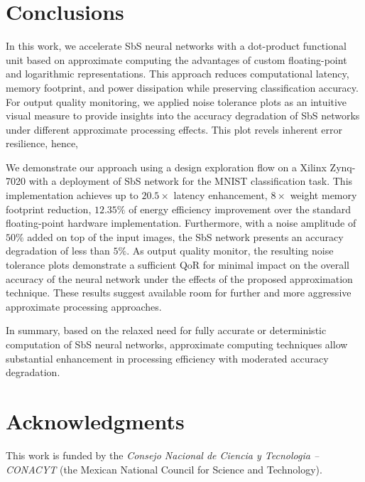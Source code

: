 \section{Conclusions}
\label{sec:conclusions}
In this work, we accelerate SbS neural networks with a dot-product functional unit based on approximate computing  the advantages of custom floating-point and logarithmic representations. This approach reduces computational latency, memory footprint, and power dissipation while preserving classification accuracy. For output quality monitoring, we applied noise tolerance plots as an intuitive visual measure to provide insights into the accuracy degradation of SbS networks under different approximate processing effects. This plot revels inherent error resilience, hence, 


We demonstrate our approach using a design exploration flow on a Xilinx Zynq-7020 with a deployment of SbS network for the MNIST classification task. This implementation achieves up to $20.5\times$ latency enhancement, $8\times$ weight memory footprint reduction,  $12.35\%$ of energy efficiency improvement over the standard floating-point hardware implementation. Furthermore, with a noise amplitude of $50\%$ added on top of the input images, the SbS network  presents an accuracy degradation of less than $5\%$. As output quality monitor, the resulting noise tolerance plots demonstrate a sufficient QoR for minimal impact on the overall accuracy of the neural network under the effects of the proposed approximation technique. These results suggest available room for further and more aggressive approximate processing approaches.


In summary, based on the relaxed need for fully accurate or deterministic computation of SbS neural networks, approximate computing techniques allow substantial enhancement in processing efficiency with moderated accuracy degradation.

\section * {Acknowledgments}\label{sec:Ack}
This work is funded by the \textit{Consejo Nacional de Ciencia y Tecnologia -- CONACYT} (the Mexican National Council for Science and Technology).

